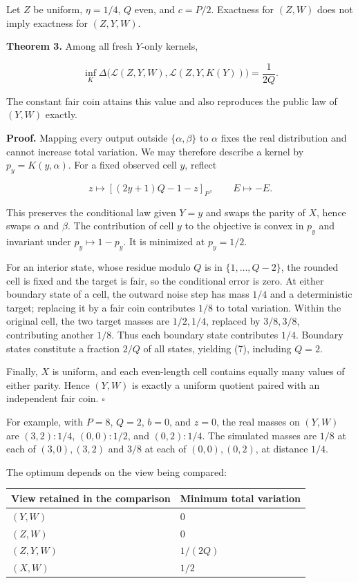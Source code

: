 \documentclass[
]{article}
\begin{document}
Let \(Z\) be uniform, \(\eta=1/4\), \(Q\) even, and \(c=P/2\). Exactness
for \((Z,W)\) does not imply exactness for \((Z,Y,W)\).

\textbf{Theorem 3.} Among all fresh \(Y\)-only kernels,

\[
\inf_K\Delta\bigl(\mathcal L(Z,Y,W),\mathcal L(Z,Y,K(Y))\bigr)=\frac1{2Q}.
\tag{7}
\]

The constant fair coin attains this value and also reproduces the public
law of \((Y,W)\) exactly.

\textbf{Proof.} Mapping every output outside \(\{\alpha,\beta\}\) to
\(\alpha\) fixes the real distribution and cannot increase total
variation. We may therefore describe a kernel by \(p_y=K(y,\alpha)\).
For a fixed observed cell \(y\), reflect

\[
z\longmapsto[(2y+1)Q-1-z]_P,\qquad E\longmapsto-E.
\]

This preserves the conditional law given \(Y=y\) and swaps the parity of
\(X\), hence swaps \(\alpha\) and \(\beta\). The contribution of cell
\(y\) to the objective is convex in \(p_y\) and invariant under
\(p_y\mapsto1-p_y\). It is minimized at \(p_y=1/2\).

For an interior state, whose residue modulo \(Q\) is in
\(\{1,\ldots,Q-2\}\), the rounded cell is fixed and the target is fair,
so the conditional error is zero. At either boundary state of a cell,
the outward noise step has mass \(1/4\) and a deterministic target;
replacing it by a fair coin contributes \(1/8\) to total variation.
Within the original cell, the two target masses are \(1/2,1/4\),
replaced by \(3/8,3/8\), contributing another \(1/8\). Thus each
boundary state contributes \(1/4\). Boundary states constitute a
fraction \(2/Q\) of all states, yielding (7), including \(Q=2\).

Finally, \(X\) is uniform, and each even-length cell contains equally
many values of either parity. Hence \((Y,W)\) is exactly a uniform
quotient paired with an independent fair coin. \(\square\)

For example, with \(P=8\), \(Q=2\), \(b=0\), and \(z=0\), the real
masses on \((Y,W)\) are \((3,2):1/4\), \((0,0):1/2\), and \((0,2):1/4\).
The simulated masses are \(1/8\) at each of \((3,0),(3,2)\) and \(3/8\)
at each of \((0,0),(0,2)\), at distance \(1/4\).

The optimum depends on the view being compared:

\begin{longtable}[]{@{}ll@{}}
\toprule\noalign{}
View retained in the comparison & Minimum total variation \\
\midrule\noalign{}
\endhead
\bottomrule\noalign{}
\endlastfoot
\((Y,W)\) & \(0\) \\
\((Z,W)\) & \(0\) \\
\((Z,Y,W)\) & \(1/(2Q)\) \\
\((X,W)\) & \(1/2\) \\
\end{longtable}
\end{document}

